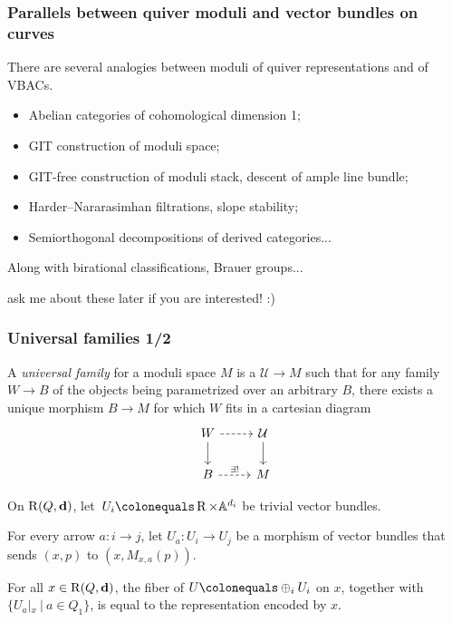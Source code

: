 \documentclass{beamer}
\begin{document}
\begin{frame}
    \frametitle{Parallels between quiver moduli and vector bundles on curves}
There are several analogies between moduli of quiver representations and of VBACs. \pause

\begin{itemize}
    \item Abelian categories of cohomological dimension 1;
    \item GIT construction of moduli space;
    \item GIT-free construction of moduli stack, descent of ample line bundle;
    \item Harder--Nararasimhan filtrations, slope stability;
    \item Semiorthogonal decompositions of derived categories...
\end{itemize} \pause

Along with birational classifications, Brauer groups...\pause

{\tiny ask me about these later if you are interested! :)}

\end{frame}
\begin{frame}
    \frametitle{Universal families 1/2}
{\small
\begin{definition}
    A \emph{universal family} for a moduli space $M$ is a $\mathcal{U} \to M$
    such that for any family $W \to B$ of the objects being parametrized over an arbitrary $B$,
    there exists a unique morphism $B \to M$ for which $W$ fits in a cartesian diagram
\[
    \begin{tikzcd}[ampersand replacement=\&]
        W \arrow[d] \arrow[r, dashed] \& \mathcal{U} \arrow[d] \\
        B \arrow[r, dashed, "\exists!"] \& M
    \end{tikzcd}
\]
\end{definition}} \pause
On $\operatorname{R}(Q, \mathbf{d})$, let~$U_i \colonequals \parameterspace \times \mathbb{A}^{d_i}$
be trivial vector bundles. \pause

For every arrow $a : i \to j$, let $U_{a} : U_i \to U_j$ be a morphism of vector bundles that
sends $(x, p)$ to $(x, M_{x, a}(p))$. \pause

\begin{lemma}
For all $x \in \operatorname{R}(Q, \mathbf{d})$,
the fiber of $U \colonequals \oplus_i U_i$ on $x$,
together with $\{U_a|_{x}~|~ a \in Q_1\}$,
is equal to the representation encoded by $x$.
\end{lemma}
\end{frame}
\end{document}
